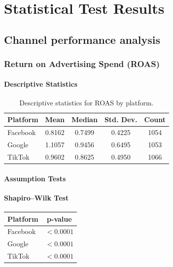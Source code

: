 
\chapter{Statistical Test Results}

\section{Channel performance analysis }\label{appendix:platform_performance_analysis}

\subsection{Return on Advertising Spend (ROAS)}\label{appendix:platform_performance_analysis_ROAS}

\subsubsection{Descriptive Statistics}

\begin{table}[H]
	\centering
	\caption{Descriptive statistics for ROAS by platform.}
	\begin{tabular}{lcccc}
		\toprule
		Platform & Mean & Median & Std. Dev. & Count \\
		\midrule
		Facebook & 0.8162 & 0.7499 & 0.4225 & 1054 \\
		Google   & 1.1057 & 0.9456 & 0.6495 & 1053 \\
		TikTok   & 0.9602 & 0.8625 & 0.4950 & 1066 \\
		\bottomrule
	\end{tabular}
\end{table}

\subsubsection{Assumption Tests}

\subsubsection{Shapiro--Wilk Test}

\begin{table}[H]
	\centering
	\begin{tabular}{lc}
		\toprule
		Platform & p-value \\
		\midrule
		Facebook & $<0.0001$ \\
		Google & $<0.0001$ \\
		TikTok & $<0.0001$ \\
		\bottomrule
	\end{tabular}
\end{table}

